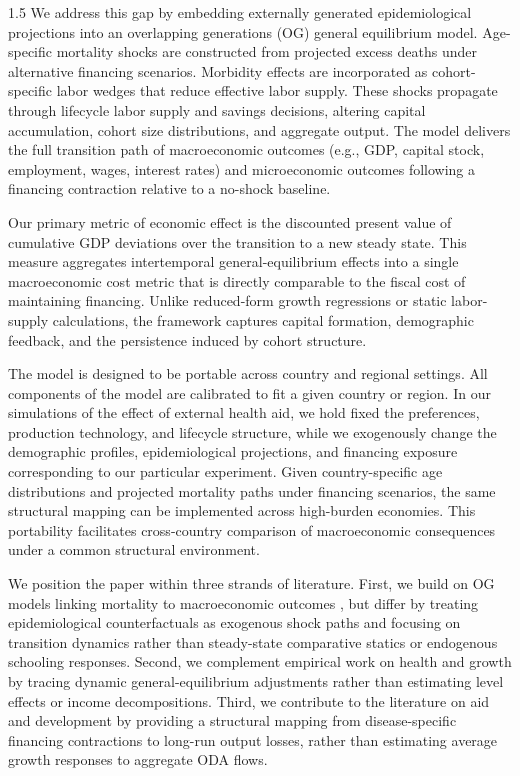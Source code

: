 \documentclass[letterpaper,12pt]{article}
\theoremstyle{definition}
\begin{document}
\begin{spacing}{1.5}
We address this gap by embedding externally generated epidemiological projections into an overlapping generations (OG) general equilibrium model. Age-specific mortality shocks are constructed from projected excess deaths under alternative financing scenarios. Morbidity effects are incorporated as cohort-specific labor wedges that reduce effective labor supply. These shocks propagate through lifecycle labor supply and savings decisions, altering capital accumulation, cohort size distributions, and aggregate output. The model delivers the full transition path of macroeconomic outcomes (e.g., GDP, capital stock, employment, wages, interest rates) and microeconomic outcomes following a financing contraction relative to a no-shock baseline.

Our primary metric of economic effect is the discounted present value of cumulative GDP deviations over the transition to a new steady state. This measure aggregates intertemporal general-equilibrium effects into a single macroeconomic cost metric that is directly comparable to the fiscal cost of maintaining financing. Unlike reduced-form growth regressions or static labor-supply calculations, the framework captures capital formation, demographic feedback, and the persistence induced by cohort structure.

The model is designed to be portable across country and regional settings. All components of the model are calibrated to fit a given country or region. In our simulations of the effect of external health aid, we hold fixed the preferences, production technology, and lifecycle structure, while we exogenously change the demographic profiles, epidemiological projections, and financing exposure corresponding to our particular experiment. Given country-specific age distributions and projected mortality paths under financing scenarios, the same structural mapping can be implemented across high-burden economies. This portability facilitates cross-country comparison of macroeconomic consequences under a common structural environment.

We position the paper within three strands of literature. First, we build on OG models linking mortality to macroeconomic outcomes \citep{kalemli-ozcan2000,bell2006}, but differ by treating epidemiological counterfactuals as exogenous shock paths and focusing on transition dynamics rather than steady-state comparative statics or endogenous schooling responses. Second, we complement empirical work on health and growth \citep{bloom2004,Weil2007} by tracing dynamic general-equilibrium adjustments rather than estimating level effects or income decompositions. Third, we contribute to the literature on aid and development by providing a structural mapping from disease-specific financing contractions to long-run output losses, rather than estimating average growth responses to aggregate ODA flows.


\end{spacing}
\end{document}
